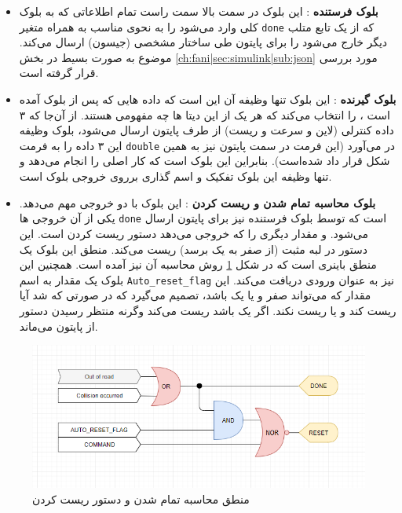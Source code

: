 \begin{itemize}
	\item \textbf{بلوک فرستنده} :
	این بلوک در سمت بالا سمت راست تمام اطلاعاتی که به بلوک کلی 
	وارد می‌شود را به نحوی مناسب به همراه متغیر \texttt{done} که از یک تابع متلب دیگر خارج می‌شود را برای پایتون طی ساختار مشخصی (جیسون) ارسال می‌کند. موضوع به صورت بسیط در بخش
	\ref{ch:fani|sec:simulink|sub:json}
	مورد بررسی قرار گرفته است.
	\item \textbf{بلوک گیرنده} :
	این بلوک تنها وظیفه آن این است که داده هایی که پس از بلوک  آمده است ، را انتخاب می‌کند که هر یک از این دیتا ها چه مفهومی هستند. از آن‌جا که ۳ داده کنترلی (لاین و سرعت و ریست) از طرف پایتون ارسال می‌شود، بلوک  وظیفه این ۳ داده را به فرمت \texttt{double} در می‌آورد (این فرمت در سمت پایتون نیز به همین شکل قرار داد شده‌است). بنابراین این بلوک  است که کار اصلی را انجام می‌دهد و تنها وظیفه این بلوک تفکیک و اسم گذاری بر‌روی خروجی بلوک  است.
	
	\item \textbf{بلوک محاسبه تمام شدن و ریست کردن} :
	این بلوک با دو خروجی مهم می‌دهد. یکی از آن خروجی ها \texttt{done} است که توسط بلوک فرستنده نیز برای پایتون ارسال می‌شود. و مقدار دیگری را که خروجی می‌دهد دستور ریست کردن است. این دستور در لبه مثبت (از صفر به یک برسد) ریست می‌کند. منطق این بلوک یک منطق باینری است که در شکل 
	\ref{fig:done-reset-logical}
	روش محاسبه آن نیز آمده است. 
	همچنین این بلوک یک مقدار به اسم \texttt{Auto\_reset\_flag} نیز به عنوان ورودی دریافت می‌کند. این مقدار که می‌تواند صفر و یا یک باشد، تصمیم می‌گیرد که در صورتی که  شد آیا ریست کند و یا ریست نکند. اگر یک باشد ریست می‌کند وگرنه منتظر رسیدن دستور از پایتون می‌ماند.
	
\end{itemize}

\begin{figure}
	\centering
	\includegraphics[width=0.7\linewidth]{Figures/done-reset-logical}
	\caption{منطق محاسبه تمام شدن و دستور ریست کردن}
	\label{fig:done-reset-logical}
\end{figure}



